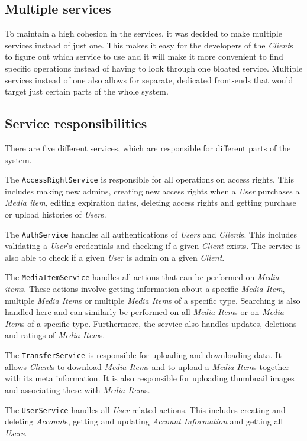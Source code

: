 \documentclass[../report.tex]{subfiles}
\begin{document}
\subsection{Multiple services}
To maintain a high cohesion in the services, it was decided to make multiple services instead of just one. This makes it easy for the developers of the \textit{Client}s to figure out which service to use and it will make it more convenient to find specific operations instead of having to look through one bloated service. Multiple services instead of one also allows for separate, dedicated front-ends that would target just certain parts of the whole system. 

\subsection{Service responsibilities}
There are five different services, which are responsible for different parts of the system. 

The \texttt{AccessRightService} is responsible for all operations on access rights. This includes making new admins, creating new access rights when a \textit{User} purchases a \textit{Media item}, editing expiration dates, deleting access rights and getting purchase or upload histories of \textit{User}s. 

The \texttt{AuthService} handles all authentications of \textit{Users} and \textit{Client}s.
This includes validating a \textit{User}'s credentials and checking if a given \textit{Client} exists.
The service is also able to check if a given \textit{User} is admin on a given \textit{Client}.

The \texttt{MediaItemService} handles all actions that can be performed on \textit{Media item}s. These actions involve getting information about a specific \textit{Media Item}, multiple \textit{Media Item}s or multiple \textit{Media Item}s of a specific type. Searching is also handled here and can similarly be performed on all \textit{Media Item}s or on \textit{Media Item}s of a specific type. Furthermore, the service also handles updates, deletions and ratings of \textit{Media Item}s.

The \texttt{TransferService} is responsible for uploading and downloading data. It allows \textit{Client}s to download \textit{Media Item}s and to upload a \textit{Media Item}s together with its meta information. It is also responsible for uploading thumbnail images and associating these with \textit{Media Item}s.

The \texttt{UserService} handles all \textit{User} related actions. This includes creating and deleting \textit{Account}s, getting and updating \textit{Account Information} and getting all \textit{Users}. 
\end{document}
